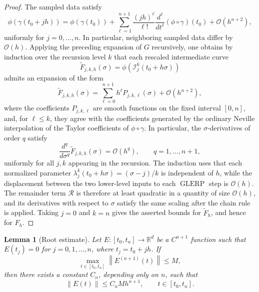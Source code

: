 \documentclass[a4paper,11pt]{article}
\newcommand{\bR}{\mathbb{R}}
\newcommand{\GLERP}{\operatorname{GLERP}}
\numberwithin{equation}{section}
\theoremstyle{plain}
\newtheorem{lemma}[thm]{Lemma}
\theoremstyle{definition}
\theoremstyle{remark}
\begin{document}
\begin{proof}
The sampled data satisfy
\[
    \phi(\gamma(t_0+jh))
    =
    \phi(\gamma(t_0))
    +
    \sum_{\ell=1}^{n+1}
    \frac{(jh)^\ell}{\ell!}
    \frac{d^\ell}{dt^\ell}(\phi\circ\gamma)(t_0)
    +
    \mathcal{O}(h^{n+2}),
\]
uniformly for \(j=0,\ldots,n\).  In particular, neighboring sampled data differ by \(\mathcal{O}(h)\).  Applying the preceding expansion of \(G\) recursively, one obtains by induction over the recursion level \(k\) that each rescaled intermediate curve
\[
    \widetilde F_{j,k,h}(\sigma)
    =
    \phi\left(\mathcal{I}_j^k(t_0+h\sigma)\right)
\]
admits an expansion of the form
\[
    \widetilde F_{j,k,h}(\sigma)
    =
    \sum_{\ell=0}^{n+1}
    h^\ell P_{j,k,\ell}(\sigma)
    +
    \mathcal{O}(h^{n+2}),
\]
where the coefficients \(P_{j,k,\ell}\) are smooth functions on the fixed interval \([0,n]\), and, for \(\ell\le k\), they agree with the coefficients generated by the ordinary Neville interpolation of the Taylor coefficients of \(\phi\circ\gamma\).  In particular, the \(\sigma\)-derivatives of order \(q\) satisfy
\[
    \frac{d^q}{d\sigma^q}\widetilde F_{j,k,h}(\sigma)=\mathcal{O}(h^q),
    \qquad q=1,\ldots,n+1,
\]
uniformly for all \(j,k\) appearing in the recursion.  The induction uses that each normalized parameter \(\lambda_j^k(t_0+h\sigma)=(\sigma-j)/k\) is independent of \(h\), while the displacement between the two lower-level inputs to each \(\GLERP\) step is \(\mathcal{O}(h)\).  The remainder term \(\mathcal{R}\) is therefore at least quadratic in a quantity of size \(\mathcal{O}(h)\), and its derivatives with respect to \(\sigma\) satisfy the same scaling after the chain rule is applied.  Taking \(j=0\) and \(k=n\) gives the asserted bounds for \(\widetilde F_h\), and hence for \(F_h\).
\end{proof}

\begin{lemma}[Root estimate]\label{lemma:root_estimate}
Let \(E:[t_0,t_n]\to\bR^d\) be a \(C^{n+1}\) function such that \(E(t_j)=0\) for \(j=0,1,\ldots,n\), where \(t_j=t_0+jh\).  If
\[
    \max_{t\in[t_0,t_n]}\left\|E^{(n+1)}(t)\right\|\le M,
\]
then there exists a constant \(C_n\), depending only on \(n\), such that
\[
    \|E(t)\|
    \le
    C_n M h^{n+1},
    \qquad t\in[t_0,t_n].
\]
\end{lemma}
\end{document}
